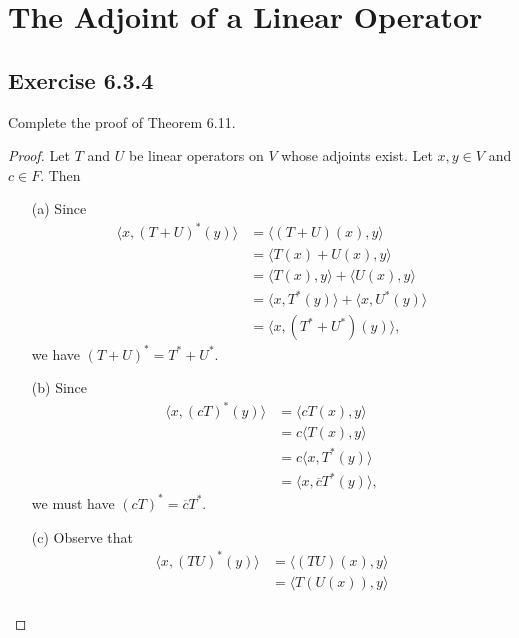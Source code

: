 \section{The Adjoint of a Linear Operator}

\subsection*{Exercise 6.3.4} Complete the proof of Theorem 6.11.
\begin{proof}
Let \( T \) and \( U  \) be linear operators on \( V  \) whose adjoints exist. Let \( x,y \in V  \) and \( c \in F  \). Then
\begin{enumerate}
    \item[(a)] Since
        \begin{align*}
            \langle x , (T+U)^{*}(y) \rangle &= \langle (T+U)(x) , y  \rangle \\
                                             &= \langle T(x) + U(x) , y \rangle \\
                                             &= \langle T(x) , y  \rangle + \langle U(x) , y \rangle \\
                                             &= \langle x , T^{*}(y) \rangle + \langle x ,  U^{*}(y) \rangle \\
                                             &= \langle x , (T^{*} + U^{*})(y) \rangle,
        \end{align*}
        we have \( (T+U)^{*} = T^{*} + U^{*} \).
    \item[(b)] Since
        \begin{align*}
            \langle x , (cT)^{*}(y) \rangle &= \langle cT(x) , y \rangle \\
                                            &= c \langle T(x)   , y \rangle \\
                                            &= c \langle x  , T^{*}(y) \rangle \\
                                            &=  \langle x  ,  \overline{c} T^{*}(y) \rangle,
        \end{align*}
        we must have \( (cT)^{*} = \overline{c} T^{*} \).
    \item[(c)] Observe that
        \begin{align*}
            \langle x , (TU)^{*}(y) \rangle &= \langle (TU)(x) , y \rangle \\
                                            &= \langle T(U(x)) , y \rangle \\

\end{align*}
\end{enumerate}
\end{proof}
